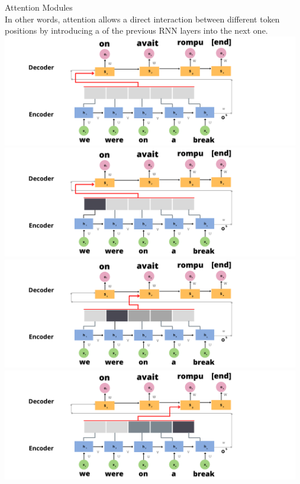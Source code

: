 \documentclass[9pt]{beamer}
\begin{document}
\begin{frame}{Attention Modules} %
\vspace{0.3cm}\\
    In other words, attention allows a direct interaction between different token positions by introducing a  of the previous RNN layers into the next one.
\centering
{} {
        \includegraphics[width = 13cm]{img/attn_layer1.png}
}
 {
        \includegraphics[width = 13cm]{img/attn_layer2.png}
}
 {
        \includegraphics[width = 13cm]{img/attn_layer3.png}
}
 {
        \includegraphics[width = 13cm]{img/attn_layer4.png}
}
\end{frame}
\end{document}
